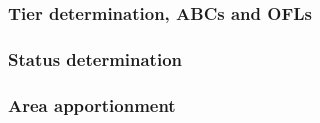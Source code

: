 \documentclass[]{tufte-handout}
\begin{document}
\hypertarget{tier-determination-abcs-and-ofls-8}{%
\subsubsection{Tier determination, ABCs and
OFLs}\label{tier-determination-abcs-and-ofls-8}}

\hypertarget{status-determination-9}{%
\subsubsection{Status determination}\label{status-determination-9}}

\hypertarget{area-apportionment-9}{%
\subsubsection{Area apportionment}\label{area-apportionment-9}}
\end{document}
